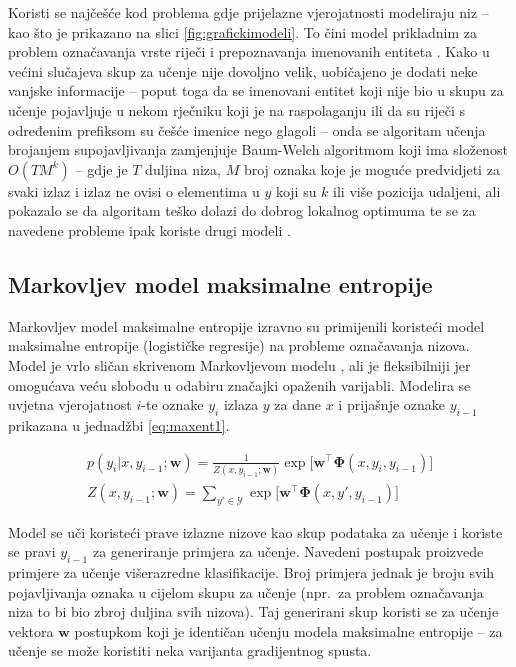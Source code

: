 Koristi se najčešće kod problema gdje prijelazne vjerojatnosti modeliraju niz --
kao što je prikazano na slici \ref{fig:grafickimodeli}. To čini model prikladnim
za problem označavanja vrste riječi \citep{halacsy2007hunpos} i prepoznavanja
imenovanih entiteta \citep{zhou2002named}. Kako u većini slučajeva skup za
učenje nije dovoljno velik, uobičajeno je dodati neke vanjske informacije --
poput toga da se imenovani entitet koji nije bio u skupu za učenje pojavljuje u
nekom rječniku koji je na raspolaganju ili da su riječi s određenim prefiksom su
češće imenice nego glagoli -- onda se algoritam učenja brojanjem supojavljivanja
zamjenjuje Baum-Welch algoritmom koji ima složenost $O(T M^k)$ -- gdje je $T$
duljina niza, $M$ broj oznaka koje je moguće predvidjeti za svaki izlaz i izlaz ne
ovisi o elementima u $y$ koji su $k$ ili više pozicija udaljeni, ali pokazalo se
da algoritam teško dolazi do dobrog lokalnog optimuma te se za navedene
probleme ipak koriste drugi modeli \citep{johnson2007doesn}.

\subsection{Markovljev model maksimalne entropije}

Markovljev model maksimalne entropije 
izravno su primijenili \citet*{mccallum2000maximum} koristeći model maksimalne
entropije (logističke regresije) na probleme označavanja nizova. Model je vrlo
sličan skrivenom Markovljevom modelu , ali je
fleksibilniji jer omogućava veću slobodu u odabiru značajki opaženih varijabli.
Modelira se uvjetna vjerojatnost $i$-te oznake $y_i$ izlaza $y$ za dane $x$ i
prijašnje oznake $y_{i-1}$ prikazana u jednadžbi \ref{eq:maxent1}.

\begin{equation}\label{eq:maxent1}
\begin{aligned}
  p(y_i | x, y_{i-1}; \mathbf{w}) = \frac{1}{Z(x, y_{i-1}; \mathbf{w})} \exp \big[ \mathbf{w}^\top \mathbf{\Phi}(x, y_i, y_{i-1})\big] \\
  Z(x, y_{i-1}; \mathbf{w}) = \sum_{y' \in \mathcal{Y}} \exp \big[ \mathbf{w}^\top \mathbf{\Phi}(x, y', y_{i-1})\big]
\end{aligned}
\end{equation}

\noindent
Model se uči koristeći prave izlazne nizove kao skup podataka za učenje i
koriste se pravi $y_{i-1}$ za generiranje primjera za učenje. Navedeni postupak
proizvede primjere za učenje višerazredne klasifikacije. Broj primjera jednak je
broju svih pojavljivanja oznaka u cijelom skupu za učenje (npr.~za problem
označavanja niza to bi bio zbroj duljina svih nizova). Taj generirani skup
koristi se za učenje vektora $\mathbf{w}$ postupkom koji je identičan učenju
modela maksimalne entropije -- za učenje se može koristiti neka varijanta
gradijentnog spusta.

